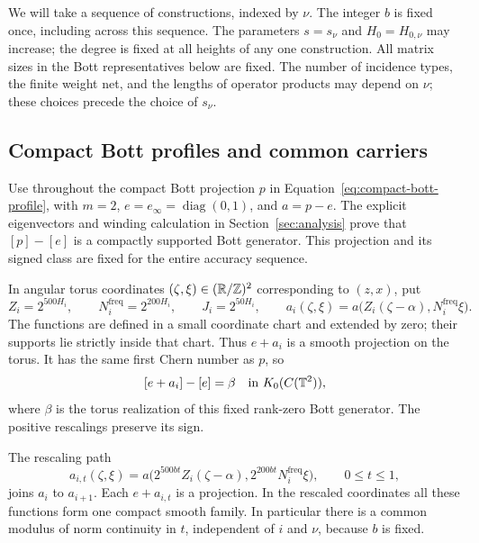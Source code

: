 We will take a sequence of constructions, indexed by $\nu$.  The integer $b$
is fixed once, including across this sequence.  The parameters $s=s_\nu$ and
$H_0=H_{0,\nu}$ may increase; the degree is fixed at all heights of any one
construction.  All matrix sizes in the Bott representatives below are fixed.
The number of incidence types, the finite weight net, and the lengths of
operator products may depend on $\nu$; these choices precede the choice of
$s_\nu$.

\subsection{Compact Bott profiles and common carriers}

Use throughout the compact Bott projection $p$ in
Equation~\eqref{eq:compact-bott-profile}, with $m=2$,
$e=e_\infty=\operatorname{diag}(0,1)$, and $a=p-e$.
The explicit eigenvectors and winding calculation in
Section~\ref{sec:analysis} prove that $[p]-[e]$ is a compactly supported
Bott generator.  This projection and its signed class are fixed for the
entire accuracy sequence.

In angular torus coordinates $(\zeta,\xi)\in(\mathbb R/\mathbb Z)^2$ corresponding to
$(z,x)$, put
\[
 Z_i=2^{500H_i},\qquad N_i^{\mathrm{freq}}=2^{200H_i},\qquad J_i=2^{50H_i},
 \qquad
 a_i(\zeta,\xi)=a\bigl(Z_i(\zeta-\alpha),N_i^{\mathrm{freq}}\xi\bigr).
\]
The functions are defined in a small coordinate chart and extended by zero;
their supports lie strictly inside that chart.  Thus $e+a_i$ is a smooth
projection on the torus.  It has the same first Chern number as $p$, so
\begin{equation}\label{eq:physical-bott-profile}
 [e+a_i]-[e]=\beta\quad\hbox{in }K_0(C(\mathbb T^2)),
\end{equation}
where $\beta$ is the torus realization of this fixed rank-zero Bott
generator.  The positive rescalings preserve its sign.

The rescaling path
\begin{equation}\label{eq:adjacent-rescaling}
 a_{i,t}(\zeta,\xi)
 =a\bigl(2^{500bt}Z_i(\zeta-\alpha),
          2^{200bt}N_i^{\mathrm{freq}}\xi\bigr),\qquad 0\le t\le1,
\end{equation}
joins $a_i$ to $a_{i+1}$.  Each $e+a_{i,t}$ is a projection.  In the rescaled
coordinates all these functions form one compact smooth family.  In
particular there is a common modulus of norm continuity in $t$, independent
of $i$ and $\nu$, because $b$ is fixed.

